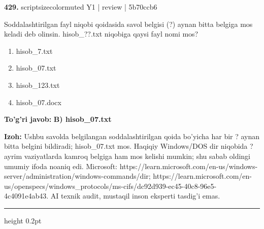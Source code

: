 \documentclass[10pt,a4paper]{article}
\begin{document}
{\bfseries\sffamily\color{ink} 429.} {scriptsizecolor{muted} Y1 | review | 5b70ccb6}
\par
Soddalashtirilgan fayl niqobi qoidasida savol belgisi (?) aynan bitta belgiga mos keladi deb olinsin. hisob\_??.txt niqobiga qaysi fayl nomi mos?
\begin{enumerate}[label=\Alph*),leftmargin=9mm]
\item hisob\_7.txt
\item hisob\_07.txt
\item hisob\_123.txt
\item hisob\_07.docx
\end{enumerate}
\begin{tcolorbox}[enhanced,breakable,colback=teal!4,colframe=teal!60!black,boxrule=0.45pt,arc=1.2mm,left=2.7mm,right=2.7mm,top=1.8mm,bottom=1.8mm,before skip=2mm,after skip=2mm]
{\bfseries\sffamily\color{teal}To'g'ri javob:} \textbf{B) hisob\_07.txt}
\par\smallskip
{\bfseries Izoh:} Ushbu savolda belgilangan soddalashtirilgan qoida bo'yicha har bir ? aynan bitta belgini bildiradi; hisob\_07.txt mos. Haqiqiy Windows/DOS dir niqobida ? ayrim vaziyatlarda kamroq belgiga ham mos kelishi mumkin; shu sabab oldingi umumiy ifoda noaniq edi. Microsoft: https://learn.microsoft.com/en-us/windows-server/administration/windows-commands/dir; https://learn.microsoft.com/en-us/openspecs/windows\_protocols/ms-cifs/dc92d939-ec45-40c8-96e5-4c4091e4ab43. AI texnik audit, mustaqil inson eksperti tasdig'i emas.
\end{tcolorbox}
\vspace{2mm}\hrule height 0.2pt\vspace{3mm}
\end{document}
